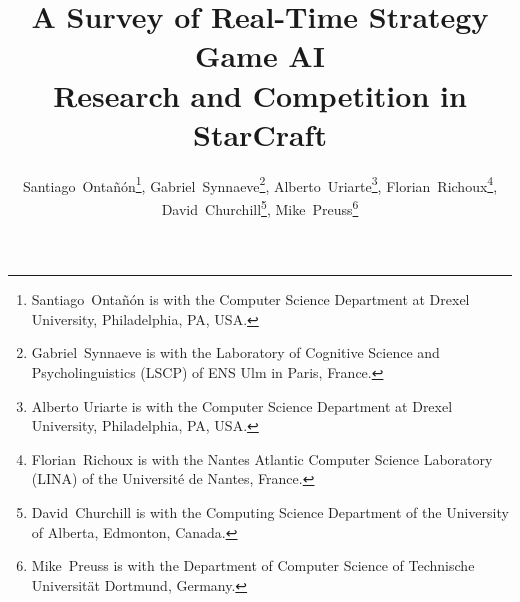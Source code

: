 \documentclass[journal]{IEEEtran}
\begin{document}
%
\title{A Survey of Real-Time Strategy Game AI\\ Research and Competition in StarCraft}
%
%
%


\author{Santiago~Onta\~{n}\'{o}n\thanks{Santiago~Onta\~{n}\'{o}n is with the Computer Science Department at Drexel University, Philadelphia, PA, USA.},
        Gabriel~Synnaeve\thanks{Gabriel~Synnaeve is with the Laboratory of Cognitive Science and Psycholinguistics (LSCP) of ENS Ulm in Paris, France.},
        Alberto~Uriarte\thanks{Alberto Uriarte is with the Computer Science Department at Drexel University, Philadelphia, PA, USA.},
        Florian~Richoux\thanks{Florian~Richoux is with the Nantes Atlantic Computer Science Laboratory (LINA) of the Universit{\'e} de Nantes, France.},
        David~Churchill\thanks{David~Churchill is with the Computing Science Department of the University of Alberta, Edmonton, Canada.},
        Mike~Preuss\thanks{Mike~Preuss is with the Department of Computer Science of Technische Universit{\"a}t Dortmund, Germany.}}



% 
%
\end{document}
